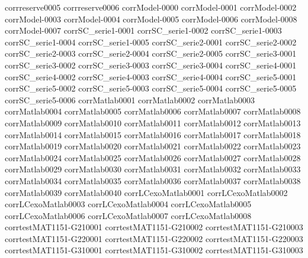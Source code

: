 {corrreserve0005}
{corrreserve0006}
{corrModel-0000}
{corrModel-0001}
{corrModel-0002}
{corrModel-0003}
{corrModel-0004}
{corrModel-0005}
{corrModel-0006}
{corrModel-0008}
{corrModel-0007}
{corrSC_serie1-0001}
{corrSC_serie1-0002}
{corrSC_serie1-0003}
{corrSC_serie1-0004}
{corrSC_serie1-0005}
{corrSC_serie2-0001}
{corrSC_serie2-0002}
{corrSC_serie2-0003}
{corrSC_serie2-0004}
{corrSC_serie2-0005}
{corrSC_serie3-0001}
{corrSC_serie3-0002}
{corrSC_serie3-0003}
{corrSC_serie3-0004}
{corrSC_serie4-0001}
{corrSC_serie4-0002}
{corrSC_serie4-0003}
{corrSC_serie4-0004}
{corrSC_serie5-0001}
{corrSC_serie5-0002}
{corrSC_serie5-0003}
{corrSC_serie5-0004}
{corrSC_serie5-0005}
{corrSC_serie5-0006}
{corrMatlab0001}
{corrMatlab0002}
{corrMatlab0003}
{corrMatlab0004}
{corrMatlab0005}
{corrMatlab0006}
{corrMatlab0007}
{corrMatlab0008}
{corrMatlab0009}
{corrMatlab0010}
{corrMatlab0011}
{corrMatlab0012}
{corrMatlab0013}
{corrMatlab0014}
{corrMatlab0015}
{corrMatlab0016}
{corrMatlab0017}
{corrMatlab0018}
{corrMatlab0019}
{corrMatlab0020}
{corrMatlab0021}
{corrMatlab0022}
{corrMatlab0023}
{corrMatlab0024}
{corrMatlab0025}
{corrMatlab0026}
{corrMatlab0027}
{corrMatlab0028}
{corrMatlab0029}
{corrMatlab0030}
{corrMatlab0031}
{corrMatlab0032}
{corrMatlab0033}
{corrMatlab0034}
{corrMatlab0035}
{corrMatlab0036}
{corrMatlab0037}
{corrMatlab0038}
{corrMatlab0039}
{corrMatlab0040}
{corrLCexoMatlab0001}
{corrLCexoMatlab0002}
{corrLCexoMatlab0003}
{corrLCexoMatlab0004}
{corrLCexoMatlab0005}
{corrLCexoMatlab0006}
{corrLCexoMatlab0007}
{corrLCexoMatlab0008}
{corrtestMAT1151-G210001}
{corrtestMAT1151-G210002}
{corrtestMAT1151-G210003}
{corrtestMAT1151-G220001}
{corrtestMAT1151-G220002}
{corrtestMAT1151-G220003}
{corrtestMAT1151-G310001}
{corrtestMAT1151-G310002}
{corrtestMAT1151-G310003}
